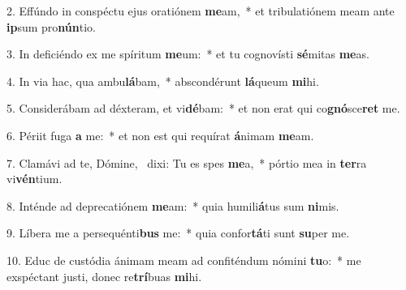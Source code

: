 2. Effúndo in conspéctu ejus oratiónem \textbf{me}am,~*  et tribulatiónem meam ante \textbf{ip}sum pro\textbf{nún}tio.\

3. In deficiéndo ex me spíritum \textbf{me}um:~*  et tu cognovísti \textbf{sé}mitas \textbf{me}as.\

4. In via hac, qua ambu\textbf{lá}bam,~*  abscondérunt \textbf{lá}queum \textbf{mi}hi.\

5. Considerábam ad déxteram, et vi\textbf{dé}bam:~*  et non erat qui co\textbf{gnó}sce\textbf{ret} me.\

6. Périit fuga \textbf{a} me:~*  et non est qui requírat \textbf{á}nimam \textbf{me}am.\

7. Clamávi ad te, Dómine, \dag\  dixi: Tu es spes \textbf{me}a,~*  pórtio mea in \textbf{ter}ra vi\textbf{vén}tium.\

8. Inténde ad deprecatiónem \textbf{me}am:~*  quia humili\textbf{á}tus sum \textbf{ni}mis.\

9. Líbera me a persequénti\textbf{bus} me:~*  quia confor\textbf{tá}ti sunt \textbf{su}per me.\

10. Educ de custódia ánimam meam ad confiténdum nómini \textbf{tu}o:~*  me exspéctant justi, donec re\textbf{trí}buas \textbf{mi}hi.\

